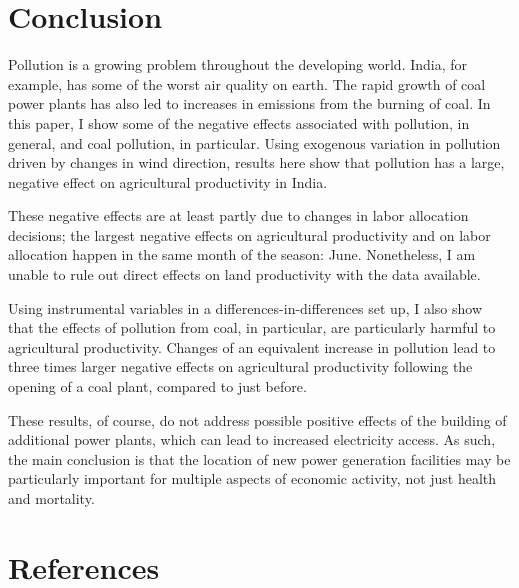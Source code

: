 \documentclass[
]{article}
\begin{document}
\hypertarget{conclusion}{%
\section{Conclusion}\label{conclusion}}

\label{conclusion}

Pollution is a growing problem throughout the developing world. India, for example, has some of the worst air quality on earth. The rapid growth of coal power plants has also led to increases in emissions from the burning of coal. In this paper, I show some of the negative effects associated with pollution, in general, and coal pollution, in particular. Using exogenous variation in pollution driven by changes in wind direction, results here show that pollution has a large, negative effect on agricultural productivity in India.

These negative effects are at least partly due to changes in labor allocation decisions; the largest negative effects on agricultural productivity and on labor allocation happen in the same month of the season: June. Nonetheless, I am unable to rule out direct effects on land productivity with the data available.

Using instrumental variables in a differences-in-differences set up, I also show that the effects of pollution from coal, in particular, are particularly harmful to agricultural productivity. Changes of an equivalent increase in pollution lead to three times larger negative effects on agricultural productivity following the opening of a coal plant, compared to just before.

These results, of course, do not address possible positive effects of the building of additional power plants, which can lead to increased electricity access. As such, the main conclusion is that the location of new power generation facilities may be particularly important for multiple aspects of economic activity, not just health and mortality.

\FloatBarrier
\newpage
\singlespacing

\hypertarget{references}{%
\section*{References}\label{references}}
\end{document}
